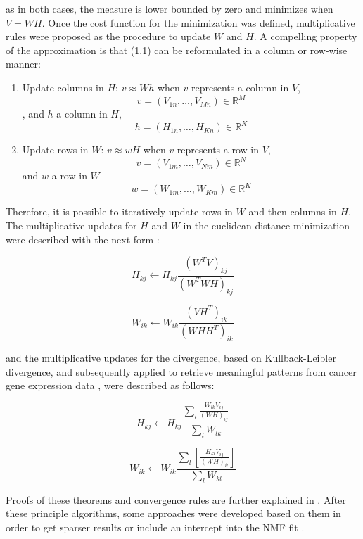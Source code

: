 as in both cases, the measure is lower bounded by zero and minimizes when \(V = WH\). Once the cost function for the minimization was defined, multiplicative rules were proposed as the procedure to update \(W\) and \(H\). A compelling property of the approximation is that (1.1) can be reformulated in a column or row-wise manner:

\begin{enumerate}
    \item Update columns in \(H\): \(v \approx Wh\) when \(v\) represents a column in \(V\), \[v = (V_{1n}, \ldots , V_{Mn}) \in \mathbb{R}^M\], and \(h\) a column in \(H\), \[h = (H_{1n}, \ldots , H_{Kn}) \in \mathbb{R}^K\]
    \item Update rows in \(W\): \(v \approx wH\) when \(v\) represents a row in \(V\), \[v = (V_{1m}, \ldots , V_{Nm}) \in \mathbb{R}^N\] and \(w\) a row in \(W\) \[w = (W_{1m}, \ldots , W_{Km}) \in \mathbb{R}^K\]
\end{enumerate}

Therefore, it is possible to iteratively update rows in \(W\) and then columns in \(H\). The multiplicative updates for \(H\) and \(W\) in the euclidean distance minimization were described with the next form \cite{Lee2001}:

\begin{equation}
    H_{kj} \leftarrow H_{kj} \frac{(W^T V)_{kj}}{(W^{T}WH)_{kj}	}
\end{equation}

\begin{equation}
    W_{ik} \leftarrow W_{ik} \frac{(V H^T)_{ik}}{(WHH^T)_{ik}}
\end{equation}

and the multiplicative updates for the divergence, based on Kullback-Leibler divergence, and subsequently applied to retrieve meaningful patterns from cancer gene expression data \cite{Brunet2004}, were described as follows:

\begin{equation}
    H_{kj} \leftarrow H_{kj} \frac{\sum_l \frac{W_{lk} V_{ij}}{(WH)_{ij}}}{\sum_l W_{lk}}
\end{equation}

\begin{equation}
    W_{ik} \leftarrow W_{ik} \frac{\sum_l \left[ \frac{H_{kl} V_{ij}}{(WH)_{il}} \right]}{\sum_l W_{kl}}
\end{equation}

Proofs of these theorems and convergence rules are further explained in \cite{Lee2001}. After these principle algorithms, some approaches were developed based on them in order to get sparser results \cite{Pascual-Montano2006} or include an intercept into the NMF fit \cite{Badea2008}.

